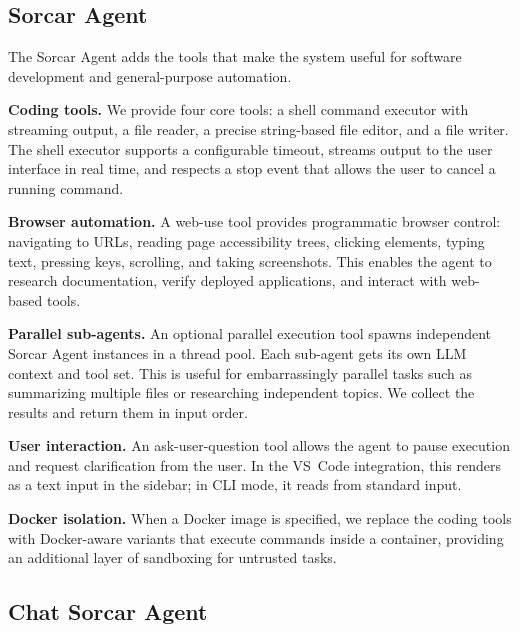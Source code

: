 \documentclass{article}
\begin{document}
\subsection{Sorcar Agent}
\label{sec:sorcar-agent}

The Sorcar Agent adds the tools that make the system useful for
software development and general-purpose automation.

\textbf{Coding tools.}  We provide four core tools: a shell command
executor with streaming output, a file reader, a precise string-based
file editor, and a file writer.  The shell executor supports a
configurable timeout, streams output to the user interface in real
time, and respects a stop event that allows the user to cancel a
running command.

\textbf{Browser automation.}  A web-use tool provides programmatic
browser control: navigating to URLs, reading page accessibility trees,
clicking elements, typing text, pressing keys, scrolling, and taking
screenshots.  This enables the agent to research documentation, verify
deployed applications, and interact with web-based tools.

\textbf{Parallel sub-agents.}  An optional parallel execution tool
spawns independent Sorcar Agent instances in a thread pool.  Each
sub-agent gets its own LLM context and tool set.  This is useful for
embarrassingly parallel tasks such as summarizing multiple files or
researching independent topics.  We collect the results and return
them in input order.

\textbf{User interaction.}  An ask-user-question tool allows the agent
to pause execution and request clarification from the user.  In the
VS~Code integration, this renders as a text input in the sidebar; in
CLI mode, it reads from standard input.

\textbf{Docker isolation.}  When a Docker image is specified, we
replace the coding tools with Docker-aware variants that execute
commands inside a container, providing an additional layer of
sandboxing for untrusted tasks.

\subsection{Chat Sorcar Agent}
\label{sec:chat-agent}
\end{document}
